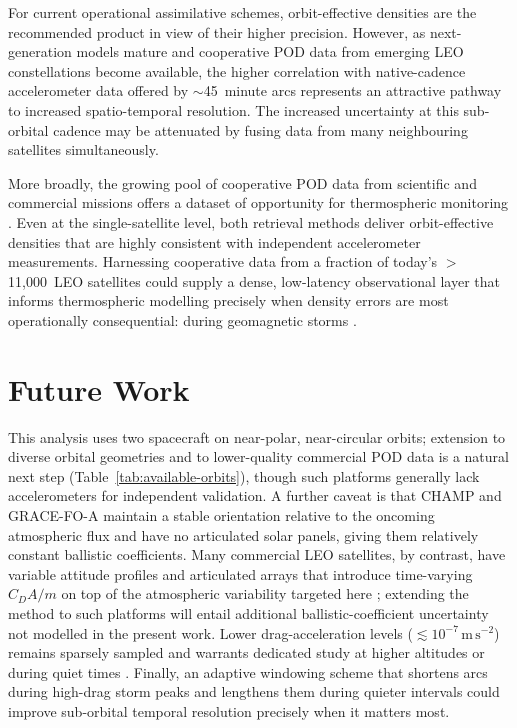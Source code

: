 \documentclass{agujournal2019}
\begin{document}
For current operational assimilative schemes, orbit-effective
densities are the recommended product in view of their higher precision.
However, as next-generation models mature and cooperative POD data from
emerging LEO constellations become available, the higher correlation with
native-cadence accelerometer data offered by $\sim$45~minute arcs
represents an attractive pathway to increased spatio-temporal resolution.
The increased uncertainty at this sub-orbital cadence may be attenuated
by fusing data from many neighbouring satellites simultaneously.

More broadly, the growing pool of cooperative POD data from scientific and
commercial missions offers a dataset of opportunity for thermospheric
monitoring \cite{Fitzpatrick2024ApplyingSatellite, Arnold2023PreciseSatellites}.
Even at the single-satellite level, both retrieval methods deliver
orbit-effective densities that are highly consistent with independent
accelerometer measurements. Harnessing cooperative data from a fraction of
today's $>$11,000~LEO satellites could supply a dense, low-latency
observational layer that informs thermospheric modelling precisely when
density errors are most operationally consequential: during geomagnetic
storms \cite{Parker2024SatelliteGannon, Parker2024InfluencesAssessment,
Berger2023TheOperations}.

\section{Future Work}
This analysis uses two spacecraft on near-polar, near-circular orbits; extension to diverse orbital geometries and to lower-quality commercial POD data \cite{Arnold2023PreciseSatellites, Fitzpatrick2024HarnessingAwareness} is a natural next step (Table~\ref{tab:available-orbits}), though such platforms generally lack accelerometers for independent validation. A further caveat is that CHAMP and GRACE-FO-A maintain a stable orientation relative to the oncoming atmospheric flux and have no articulated solar panels, giving them relatively constant ballistic coefficients. Many commercial LEO satellites, by contrast, have variable attitude profiles and articulated arrays that introduce time-varying $C_{D}A/m$ on top of the atmospheric variability targeted here \cite{Fitzpatrick2024HarnessingAwareness}; extending the method to such platforms will entail additional ballistic-coefficient uncertainty not modelled in the present work. Lower drag-acceleration levels ($\lesssim 10^{-7}\,\mathrm{m\,s^{-2}}$) remains sparsely sampled and warrants dedicated study at higher altitudes or during quiet times \cite{Ray2024ErrorMinimum}. Finally, an adaptive windowing scheme that shortens arcs during high-drag storm peaks and lengthens them during quieter intervals could improve sub-orbital temporal resolution precisely when it matters most.
\end{document}

